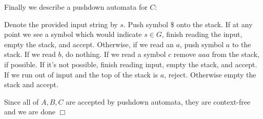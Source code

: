 \documentclass{article}
\newenvironment{myindentpar}[1]
  {\begin{list}{}
          {\setlength{\leftmargin}{#1}
          \setlength{\rightmargin}{#1}}
          \item[]
  }
  {\end{list}}
\begin{document}
Finally we describe a pushdown automata for $C$:
\begin{myindentpar}{1em}
Denote the provided input string by $s$. Push symbol $\$$ onto the stack. If at any point we see a symbol which would indicate $s \in G$, finish reading the input, empty the stack, and accept. Otherwise, if we read an $a$, push symbol $a$ to the stack. If we read $b$, do nothing. If we read a symbol $c$ remove $aaa$ from the stack, if possible. If it's not possible, finish reading input, empty the stack, and accept. If we run out of input and the top of the stack is $a$, reject. Otherwise empty the stack and accept.
\end{myindentpar}
Since all of $A,B,C$ are accepted by pushdown automata, they are context-free and we are done $\Box$
\end{document}
